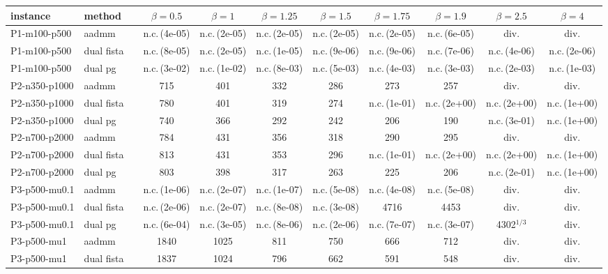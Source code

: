 \begin{tabular}{llrcccccccc}
\toprule
instance & method & & $\beta=0.5$ & $\beta=1$ & $\beta=1.25$ & $\beta=1.5$ & $\beta=1.75$ & $\beta=1.9$ & $\beta=2.5$ & $\beta=4$\\
\midrule
P1-m100-p500 & aadmm & & n.c.\,(4e-05) & n.c.\,(2e-05) & n.c.\,(2e-05) & n.c.\,(2e-05) & n.c.\,(2e-05) & n.c.\,(6e-05) & div. & div.\\
P1-m100-p500 & dual fista & & n.c.\,(8e-05) & n.c.\,(2e-05) & n.c.\,(1e-05) & n.c.\,(9e-06) & n.c.\,(9e-06) & n.c.\,(7e-06) & n.c.\,(4e-06) & n.c.\,(2e-06)\\
P1-m100-p500 & dual pg & & n.c.\,(3e-02) & n.c.\,(1e-02) & n.c.\,(8e-03) & n.c.\,(5e-03) & n.c.\,(4e-03) & n.c.\,(3e-03) & n.c.\,(2e-03) & n.c.\,(1e-03)\\
\midrule
P2-n350-p1000 & aadmm & & 715 & 401 & 332 & 286 & 273 & 257 & div. & div.\\
P2-n350-p1000 & dual fista & & 780 & 401 & 319 & 274 & n.c.\,(1e-01) & n.c.\,(2e+00) & n.c.\,(2e+00) & n.c.\,(1e+00)\\
P2-n350-p1000 & dual pg & & 740 & 366 & 292 & 242 & 206 & 190 & n.c.\,(3e-01) & n.c.\,(1e+00)\\
\midrule
P2-n700-p2000 & aadmm & & 784 & 431 & 356 & 318 & 290 & 295 & div. & div.\\
P2-n700-p2000 & dual fista & & 813 & 431 & 353 & 296 & n.c.\,(1e-01) & n.c.\,(2e+00) & n.c.\,(2e+00) & n.c.\,(1e+00)\\
P2-n700-p2000 & dual pg & & 803 & 398 & 317 & 263 & 225 & 206 & n.c.\,(2e-01) & n.c.\,(1e+00)\\
\midrule
P3-p500-mu0.1 & aadmm & & n.c.\,(1e-06) & n.c.\,(2e-07) & n.c.\,(1e-07) & n.c.\,(5e-08) & n.c.\,(4e-08) & n.c.\,(5e-08) & div. & div.\\
P3-p500-mu0.1 & dual fista & & n.c.\,(2e-06) & n.c.\,(2e-07) & n.c.\,(8e-08) & n.c.\,(3e-08) & 4716 & 4453 & div. & div.\\
P3-p500-mu0.1 & dual pg & & n.c.\,(6e-04) & n.c.\,(3e-05) & n.c.\,(8e-06) & n.c.\,(2e-06) & n.c.\,(7e-07) & n.c.\,(3e-07) & 4302$^{1/3}$ & div.\\
\midrule
P3-p500-mu1 & aadmm & & 1840 & 1025 & 811 & 750 & 666 & 712 & div. & div.\\
P3-p500-mu1 & dual fista & & 1837 & 1024 & 796 & 662 & 591 & 548 & div. & div.\\

\end{tabular}
